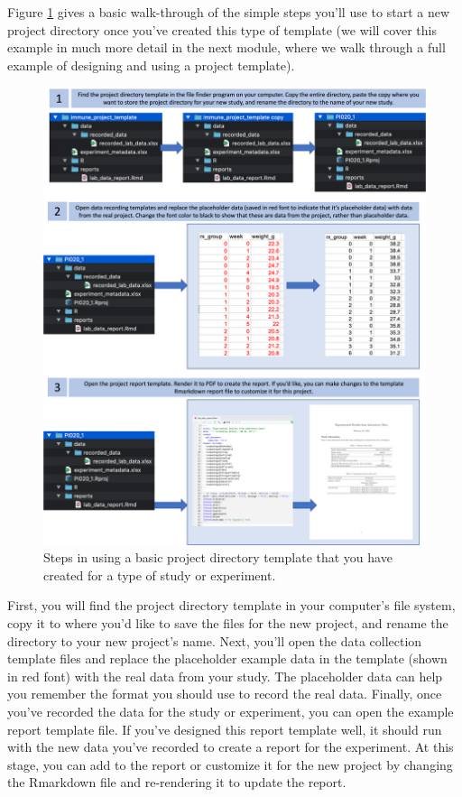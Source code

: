 \documentclass[]{tufte-book}
\begin{document}
Figure \ref{fig:basicprojecttemplateuse} gives a basic walk-through of the
simple steps you'll use to start a new project directory once you've created
this type of template (we will cover this example in much more detail in the
next module, where we walk through a full example of designing and using a
project template).

\begin{figure}
\includegraphics[width=\textwidth]{figures/project_template_basic_use} \caption[Steps in using a basic project directory template that you have created for a type of study or experiment]{Steps in using a basic project directory template that you have created for a type of study or experiment.}\label{fig:basicprojecttemplateuse}
\end{figure}

First, you will find the project directory template in your
computer's file system, copy it to where you'd like to save the files for the
new project, and rename the directory to your new project's name. Next, you'll
open the data collection template files and replace the placeholder example data
in the template (shown in red font) with the real data from your study. The
placeholder data can help you remember the format you should use to record the
real data. Finally, once you've recorded the data for the study or experiment,
you can open the example report template file. If you've designed this report
template well, it should run with the new data you've recorded to create a
report for the experiment. At this stage, you can add to the report or customize
it for the new project by changing the Rmarkdown file and re-rendering it to
update the report.
\end{document}
